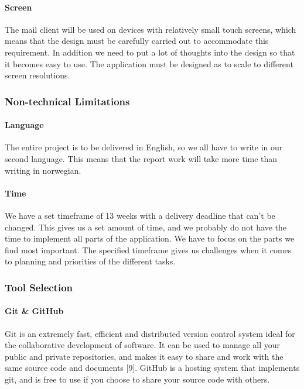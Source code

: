\paragraph{Screen}
The mail client will be used on devices with relatively small touch screens, which means that the design must be carefully carried out to accommodate this requirement. In addition we need to put a lot of thoughts into the design so that it becomes easy to use. The application must be designed as to scale to different screen resolutions.

\subsubsection{Non-technical Limitations}

\paragraph{Language}
The entire project is to be delivered in English, so we all have to write in our second language. This means that the report work will take more time than writing in norwegian. 

\paragraph{Time}
We have a set timeframe of 13 weeks with a delivery deadline that can’t be changed. This gives us a set amount of time, and we probably do not have the time to implement all parts of the application. We have to focus on the parts we find most important. The specified timeframe gives us challenges when it comes to planning and priorities of the different tasks.

\subsubsection{Tool Selection}

\paragraph{Git \& GitHub}
Git is an extremely fast, efficient and distributed version control system ideal for the collaborative development of software. It can be used to manage all your public and private repositories, and makes it easy to share and work with the same source code and documents [9]. GitHub is a hosting system that implements git, and is free to use if you choose to share your source code with others. 

